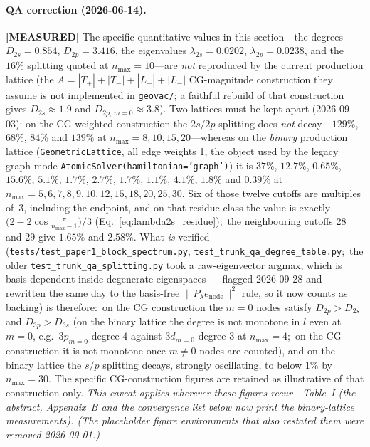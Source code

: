 \documentclass[aps,pra,twocolumn,superscriptaddress,longbibliography]{revtex4-2}
\begin{document}
\paragraph{QA correction (2026-06-14).}  \textbf{[MEASURED]} The specific quantitative
values in this section---the degrees $D_{2s} = 0.854$, $D_{2p} = 3.416$,
the eigenvalues $\lambda_{2s} = 0.0202$, $\lambda_{2p} = 0.0238$, and the
$16\%$ splitting quoted at $n_{\max} = 10$---are \emph{not} reproduced by
the current production lattice (the $A = |T_+| + |T_-| + |L_+| + |L_-|$
CG-magnitude construction they assume is not implemented in
\texttt{geovac/}; a faithful rebuild of that construction gives
$D_{2s} \approx 1.9$ and $D_{2p,\,m=0} \approx 3.8$).  Two lattices must be
kept apart (2026-09-03): on the CG-weighted construction the $2s/2p$
splitting does \emph{not} decay---$129\%$, $68\%$, $84\%$ and $139\%$ at
$n_{\max} = 8, 10, 15, 20$---whereas on the \emph{binary} production
lattice (\texttt{GeometricLattice}, all edge weights 1, the object
used by the legacy graph mode \texttt{AtomicSolver(hamiltonian='graph')})
it is $37\%$, $12.7\%$, $0.65\%$, $15.6\%$,
$5.1\%$, $1.7\%$, $2.7\%$, $1.7\%$, $1.1\%$, $4.1\%$, $1.8\%$ and $0.39\%$
at $n_{\max} = 5, 6, 7, 8, 9, 10, 12, 15, 18, 20, 25, 30$.  Six of those twelve
cutoffs are multiples of~$3$, including the endpoint, and on that residue class
the value is exactly $\bigl(2-2\cos\frac{\pi}{n_{\max}-1}\bigr)/3$
(Eq.~\eqref{eq:lambda2s_residue});\ the neighbouring cutoffs $28$ and $29$ give
$1.65\%$ and $2.58\%$.  What \emph{is}
verified (\texttt{tests/test\_paper1\_block\_spectrum.py},
\texttt{test\_trunk\_qa\_degree\_table.py};\ the older
\texttt{test\_trunk\_qa\_splitting.py} took a raw-eigenvector argmax,
which is basis-dependent inside degenerate eigenspaces --- flagged
2026-09-28 and rewritten the same day to the basis-free
$\|P_\lambda e_{\mathrm{node}}\|^2$ rule, so it now counts as backing)
is therefore:\ on the CG construction the $m = 0$ nodes satisfy
$D_{2p} > D_{2s}$ and $D_{3p} > D_{3s}$ (on the binary lattice the
degree is not monotone in $l$ even at $m = 0$, e.g.\ $3p_{m=0}$ degree $4$
against $3d_{m=0}$ degree $3$ at $n_{\max} = 4$;\ on the CG construction it is
not monotone once $m \ne 0$ nodes are counted), and on the binary lattice the $s/p$ splitting decays,
strongly oscillating, to below $1\%$ by $n_{\max} = 30$.  The specific
CG-construction figures are retained as illustrative of that
construction only. \emph{This caveat applies wherever these figures
recur---Table~I (the abstract, Appendix~B and the convergence list
below now print the binary-lattice measurements).  (The
placeholder figure environments that also restated them were removed
2026-09-01.)}
\end{document}
